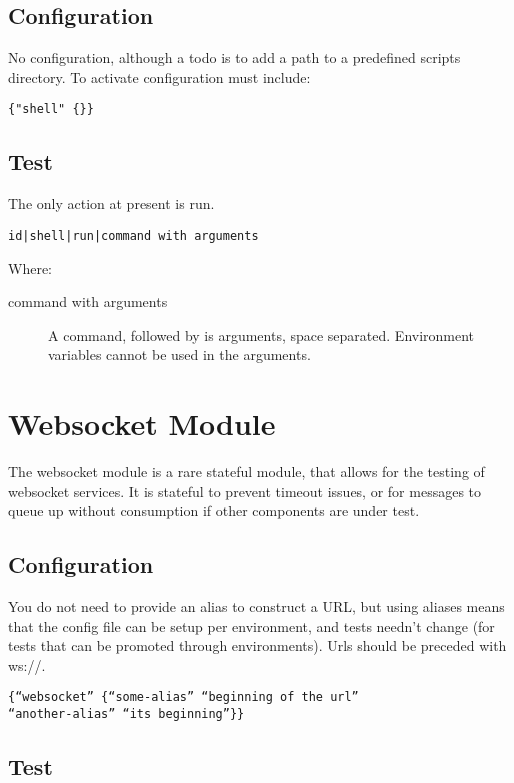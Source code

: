 \documentclass[12pt,a4paper,koma]{article}
\begin{document}
\subsection{Configuration}
\label{sec-5-1}
No configuration, although a todo is to add a path to a predefined scripts
directory. To activate configuration must include:
\begin{verbatim}
{"shell" {}}
\end{verbatim}
\subsection{Test}
\label{sec-5-2}
The only action at present is run.

\begin{verbatim}
id|shell|run|command with arguments
\end{verbatim}

Where:
\begin{description}
\item[{command with arguments}] A command, followed by is arguments, space
separated. Environment variables cannot be used in the arguments.
\end{description}
\section{Websocket Module}
\label{sec-6}
The websocket module is a rare stateful module, that allows for the
testing of websocket services. It is stateful to prevent timeout
issues, or for messages to queue up without consumption if other
components are under test.

\subsection{Configuration}
\label{sec-6-1}
You do not need to provide an alias to construct a URL, but using
aliases means that the config file can be setup per environment, and
tests needn’t change (for tests that can be promoted through
environments). Urls should be preceded with ws://.
\begin{verbatim}
{“websocket” {“some-alias” “beginning of the url”
“another-alias” “its beginning”}}
\end{verbatim}
\subsection{Test}
\label{sec-6-2}
\end{document}
